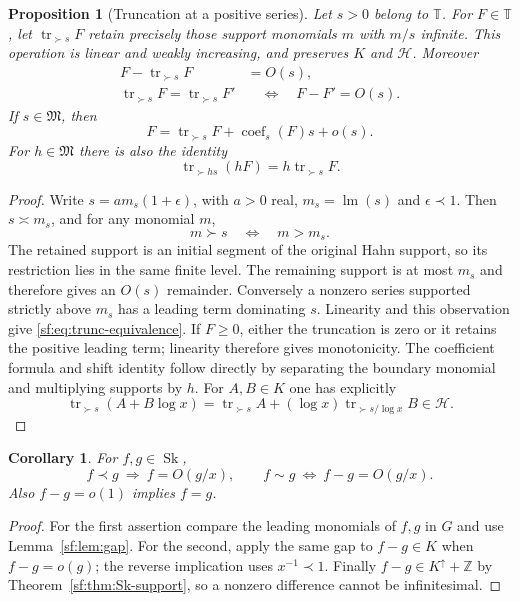 \documentclass[11pt]{article}
\newtheorem{proposition}[theorem]{Proposition}
\newtheorem{corollary}[theorem]{Corollary}
\theoremstyle{definition}
\theoremstyle{remark}
\newcommand{\Sk}{\operatorname{Sk}}
\newcommand{\T}{\mathbb T}
\newcommand{\up}{\uparrow}
\newcommand{\Z}{\mathbb Z}
\newcommand{\arch}{\mathrel{\asymp}}
\newcommand{\tr}{\operatorname{tr}}
\newcommand{\lm}{\operatorname{lm}}
\DeclareMathOperator{\coef}{coef}
\numberwithin{equation}{section}
\begin{document}
\begin{proposition}[Truncation at a positive series]\label{sf:prop:trunc}
Let $s>0$ belong to $\T$. For $F\in\T$, let
$\tr_{\succ s}F$ retain precisely those support monomials
$m$ with $m/s$ infinite. This operation is linear and weakly
increasing, and preserves $K$ and $\mathcal H$. Moreover
\begin{align}
 F-\tr_{\succ s}F&=O(s),\\
 \tr_{\succ s}F=\tr_{\succ s}F'
       &\quad\Longleftrightarrow\quad F-F'=O(s).
 \label{sf:eq:trunc-equivalence}
\end{align}
If $s\in\mathfrak M$, then
\[
 F=\tr_{\succ s}F+\coef_s(F)s+o(s).
\]
For $h\in\mathfrak M$ there is also the identity
\[
 \tr_{\succ hs}(hF)=h\tr_{\succ s}F.
\]
\end{proposition}
\begin{proof}
Write $s=a m_s(1+\epsilon)$, with $a>0$ real,
$m_s=\lm(s)$ and $\epsilon\prec1$. Then $s\arch m_s$, and
for any monomial $m$,
\[
 m\succ s\quad\Longleftrightarrow\quad m>m_s.
\]
The retained support is an initial segment of the original Hahn
support, so its restriction lies in the same finite level.
The remaining support is at most $m_s$ and therefore gives
an $O(s)$ remainder. Conversely a nonzero series supported
strictly above $m_s$ has a leading term dominating $s$.
Linearity and this observation give \eqref{sf:eq:trunc-equivalence}.
If $F\ge0$, either the truncation is zero or it retains the
positive leading term; linearity therefore gives monotonicity.
The coefficient formula and shift identity follow directly by
separating the boundary monomial and multiplying supports by $h$.
For $A,B\in K$ one has explicitly
\[
 \tr_{\succ s}(A+B\log x)
 =\tr_{\succ s}A+(\log x)\tr_{\succ s/\log x}B\in\mathcal H.
\]
\end{proof}

\begin{corollary}\label{sf:cor:gaps}
For $f,g\in\Sk$,
\[
 f\prec g\ \Longrightarrow\ f=O(g/x),\qquad
 f\sim g\ \Longleftrightarrow\ f-g=O(g/x).
\]
Also $f-g=o(1)$ implies $f=g$.
\end{corollary}
\begin{proof}
For the first assertion compare the leading monomials of $f,g$ in
$G$ and use Lemma~\ref{sf:lem:gap}. For the second, apply the
same gap to $f-g\in K$ when $f-g=o(g)$; the reverse implication
uses $x^{-1}\prec1$. Finally $f-g\in K^\up+\Z$ by
Theorem~\ref{sf:thm:Sk-support}, so a nonzero difference cannot
be infinitesimal.
\end{proof}
\end{document}
